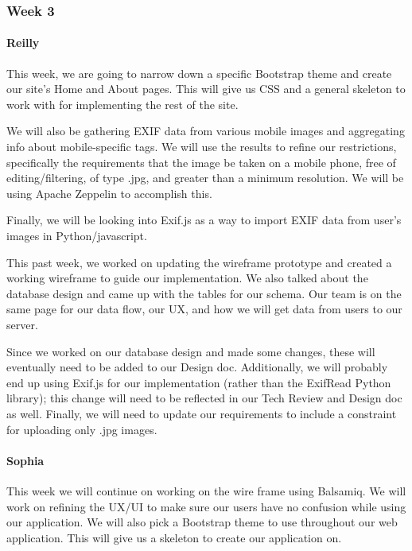 \documentclass[onecolumn, draftclsnofoot,10pt, compsoc]{IEEEtran}
\begin{document}
\begin{flushleft}
\subsubsection{Week 3}
\paragraph{Reilly}
 
This week, we are going to narrow down a specific Bootstrap theme and create our site's Home and About pages. This will give us CSS and a general skeleton to work with for implementing the rest of the site.
 
We will also be gathering EXIF data from various mobile images and aggregating info about mobile-specific tags. We will use the results to refine our restrictions, specifically the requirements that the image be taken on a mobile phone, free of editing/filtering, of type .jpg, and greater than a minimum resolution. We will be using Apache Zeppelin to accomplish this.
 
Finally, we will be looking into Exif.js as a way to import EXIF data from user's images in Python/javascript.
 
 
This past week, we worked on updating the wireframe prototype and created a working wireframe to guide our implementation. We also talked about the database design and came up with the tables for our schema. Our team is on the same page for our data flow, our UX, and how we will get data from users to our server.
 
 
Since we worked on our database design and made some changes, these will eventually need to be added to our Design doc. Additionally, we will probably end up using Exif.js for our implementation (rather than the ExifRead Python library); this change will need to be reflected in our Tech Review and Design doc as well. Finally, we will need to update our requirements to include a constraint for uploading only .jpg images.
 
\paragraph{Sophia}
 
This week we will continue on working on the wire frame using Balsamiq. We will work on refining the UX/UI to make sure our users have no confusion while using our application. We will also pick a Bootstrap theme to use throughout our web application. This will give us a skeleton to create our application on.
 

\end{flushleft}
\end{document}
